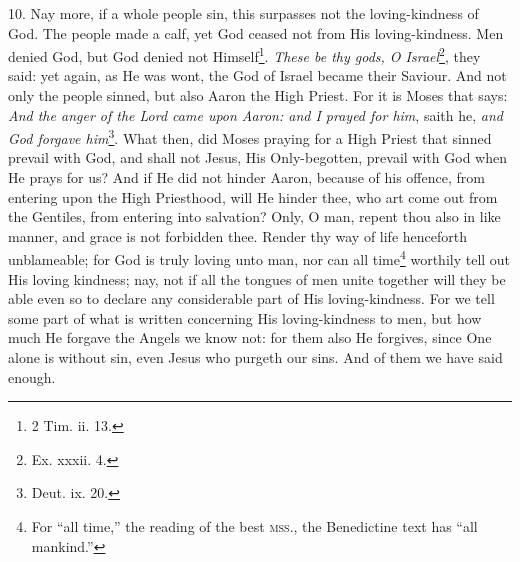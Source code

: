 10. Nay more, if a whole people sin, this surpasses not the loving-kindness of God. The people made a calf, yet God ceased not from His loving-kindness. Men denied God, but God denied not Himself\footnote{2 Tim. ii. 13.}. \emph{These be thy gods, O Israel}\footnote{Ex. xxxii. 4.}, they said: yet again, as He was wont, the God of Israel became their Saviour. And not only the people sinned, but also Aaron the High Priest. For it is Moses that says: \emph{And the anger of the Lord came upon Aaron: and I prayed for him}, saith he, \emph{and God forgave him}\footnote{Deut. ix. 20.}. What then, did Moses praying for a High Priest that sinned prevail with God, and shall not Jesus, His Only-begotten, prevail with God when He prays for us? And if He did not hinder Aaron, because of his offence, from entering upon the High Priesthood, will He hinder thee, who art come out from the Gentiles, from entering into salvation? Only, O man, repent thou also in like manner, and grace is not forbidden thee. Render thy way of life henceforth unblameable; for God is truly loving unto man, nor can all time\footnote{For “all time,” the reading of the best \textsc{mss.}, the Benedictine text has “all mankind.”} worthily tell out His loving kindness; nay, not if all the tongues of men unite together will they be able even so to declare any considerable part of His loving-kindness. For we tell some part of what is written concerning His loving-kindness to men, but how much He forgave the Angels we know not: for them also He forgives, since One alone is without sin, even Jesus who purgeth our sins. And of them we have said enough.

